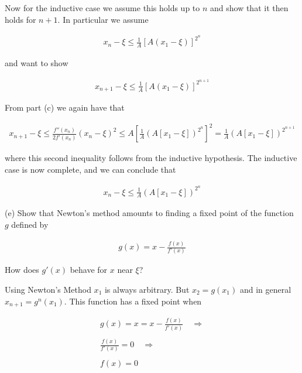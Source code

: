 \documentclass{article}
\begin{document}
  Now for the inductive case we assume this holds up to $n$ and show that it then holds for $n+1$.  In particular we assume

  \begin{align*}
    x_n-\xi \leq \frac 1 A[A(x_1-\xi)]^{2^n}
  \end{align*}

  and want to show

  \begin{align*}
    x_{n+1}-\xi\leq \frac 1 A[A(x_1-\xi)]^{2^{n+1}}
  \end{align*}

  From part (c) we again have that

  \begin{align*}
    x_{n+1}-\xi\leq \frac {f''(x_n)}{2f'(x_n)}(x_n-\xi)^2 \leq A\left[\frac 1 A(A[x_1-\xi])^{2^n}\right]^2 = \frac 1 A (A[x_1-\xi])^{2^{n+1}}
  \end{align*}

  where this second inequality follows from the inductive hypothesis.  The inductive case is now complete, and we can conclude that

  \begin{align*}
    x_{n}-\xi \leq \frac 1 A(A[x_1-\xi])^{2^n}
  \end{align*}

  \vspace{1cm}

  {\Large \color{Sepia} (e) Show that Newton's method amounts to finding a fixed point of the function $g$ defined by

  \begin{align*}
    g(x) = x-\frac{f(x)}{f'(x)}
  \end{align*}

  How does $g'(x)$ behave for $x$ near $\xi$?}

  \vspace{1cm}

  Using Newton's Method $x_1$ is always arbitrary.  But $x_2=g(x_1)$ and in general $x_{n+1}=g^n(x_1)$.  This function has a fixed point when

  \begin{align*}
    g(x)  = x = x-\frac{f(x)}{f'(x)} \quad \Rightarrow\\\\
    \frac{f(x)}{f'(x)}=0 \quad \Rightarrow \\\\
    f(x)=0
  \end{align*}
\end{document}
